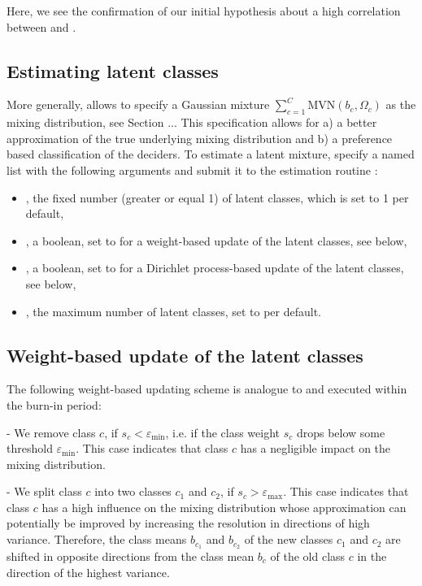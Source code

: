 \documentclass[article]{jss}
\newcommand{\fct}[1]{\code{#1()}}
\begin{document}
Here, we see the confirmation of our initial hypothesis about a high correlation between  and .

\subsection{Estimating latent classes} \label{subsec:latent_classes}

More generally,  allows to specify a Gaussian mixture $\sum_{c=1}^C \text{MVN} (b_c,\Omega_c)$ as the mixing distribution, see Section ... This specification allows for a) a better approximation of the true underlying mixing distribution and b) a preference based classification of the deciders. To estimate a latent mixture, specify a named list  with the following arguments and submit it to the estimation routine \fct{fit\_model}:
\begin{itemize}
  \item {}, the fixed number (greater or equal 1) of latent classes, which is set to 1 per default,
  \item {}, a boolean, set to  for a weight-based update of the latent classes, see below,
  \item {}, a boolean, set to  for a Dirichlet process-based update of the latent classes, see below,
  \item {}, the maximum number of latent classes, set to  per default.
\end{itemize}

\subsection{Weight-based update of the latent classes} \label{subsec:weight_update}

The following weight-based updating scheme is analogue to \cite{Bauer:2019} and executed within the burn-in period:

- We remove class $c$, if $s_c<\varepsilon_{\text{min}}$, i.e. if the class weight $s_c$ drops below some threshold $\varepsilon_{\text{min}}$. This case indicates that class $c$ has a negligible impact on the mixing distribution.

- We split class $c$ into two classes $c_1$ and $c_2$, if $s_c>\varepsilon_\text{max}$. This case indicates that class $c$ has a high influence on the mixing distribution whose approximation can potentially be improved by increasing the resolution in directions of high variance. Therefore, the class means $b_{c_1}$ and $b_{c_2}$ of the new classes $c_1$ and $c_2$ are shifted in opposite directions from the class mean $b_c$ of the old class $c$ in the direction of the highest variance.
\end{document}
